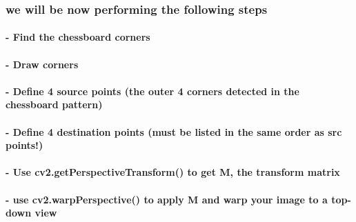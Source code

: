 \documentclass[11pt]{article}
\begin{document}
\hypertarget{we-will-be-now-performing-the-following-steps}{%
\subsubsection{we will be now performing the following
steps}\label{we-will-be-now-performing-the-following-steps}}

\hypertarget{find-the-chessboard-corners}{%
\paragraph{- Find the chessboard
corners}\label{find-the-chessboard-corners}}

\hypertarget{draw-corners}{%
\paragraph{- Draw corners}\label{draw-corners}}

\hypertarget{define-4-source-points-the-outer-4-corners-detected-in-the-chessboard-pattern}{%
\paragraph{- Define 4 source points (the outer 4 corners detected in the
chessboard
pattern)}\label{define-4-source-points-the-outer-4-corners-detected-in-the-chessboard-pattern}}

\hypertarget{define-4-destination-points-must-be-listed-in-the-same-order-as-src-points}{%
\paragraph{- Define 4 destination points (must be listed in the same
order as src
points!)}\label{define-4-destination-points-must-be-listed-in-the-same-order-as-src-points}}

\hypertarget{use-cv2.getperspectivetransform-to-get-m-the-transform-matrix}{%
\paragraph{- Use cv2.getPerspectiveTransform() to get M, the transform
matrix}\label{use-cv2.getperspectivetransform-to-get-m-the-transform-matrix}}

\hypertarget{use-cv2.warpperspective-to-apply-m-and-warp-your-image-to-a-top-down-view}{%
\paragraph{- use cv2.warpPerspective() to apply M and warp your image to
a top-down
view}\label{use-cv2.warpperspective-to-apply-m-and-warp-your-image-to-a-top-down-view}}
\end{document}
